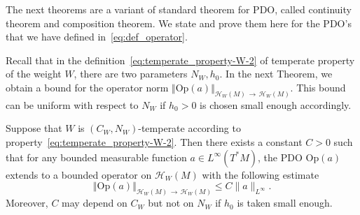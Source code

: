 \documentclass[AHL,Unicode,longabstracts,published]{cedram}
\newcommand{\clH}{\mathcal{H}}
\newcommand{\Opp}{\mathrm{Op}}
\newcommand{\clH}{\mathcal{H}}
\begin{document}
The next theorems are a variant of standard theorem for PDO, called continuity theorem and composition theorem. We state and prove them here for the PDO's that we have defined in~\eqref{eq:def_operator}.

Recall that in the definition~\eqref{eq:temperate_property-W-2} of temperate property of the weight $W$, there are two parameters $N_{W},h_{0}$. In the next Theorem, we obtain a bound for the operator norm $\Vert \Opp (a)\Vert _{\clH _{W}(M)\,\rightarrow\,\clH _{W}(M)}$. This bound can be uniform with respect to $N_{W}$ if $h_{0}>0$ is chosen small enough accordingly.

\begin{cBoxB}{}
\begin{theo}\label{thm:Continuity-of-PDO}
Suppose that $W$ is $(C_{W},N_{W})$-temperate according to property~\eqref{eq:temperate_property-W-2}. Then there exists a constant $C>0$ such that for any bounded measurable function $a\in L^{\infty}(T^{*}M)$, the PDO $\Opp (a)$ extends to a bounded operator on $\clH _{W}(M)$ with the following estimate
\[
\left\Vert \Opp (a)\right\Vert _{\clH _{W}(M)\,\rightarrow\,\clH _{W}(M)}\leq C\|a\|_{L^{\infty}}.
\]
Moreover, $C$ may depend on $C_{W}$ but not on $N_{W}$ if $h_{0}$ is taken small enough.
\end{theo}
\end{cBoxB}
\end{document}

